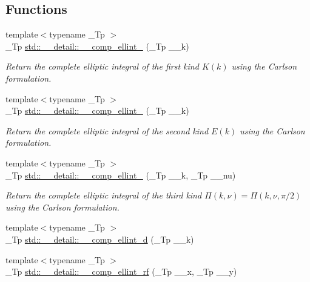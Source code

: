 \subsection*{Functions}
\begin{DoxyCompactItemize}
\item 
{\footnotesize template$<$typename \+\_\+\+Tp $>$ }\\\+\_\+\+Tp \hyperlink{namespacestd_1_1____detail_a7b23bcf7e9f20b1e353a047126e13af1}{std\+::\+\_\+\+\_\+detail\+::\+\_\+\+\_\+comp\+\_\+ellint\+\_} (\+\_\+\+Tp \+\_\+\+\_\+k)
\begin{DoxyCompactList}\small\item\em Return the complete elliptic integral of the first kind $ K(k) $ using the Carlson formulation. \end{DoxyCompactList}\item 
{\footnotesize template$<$typename \+\_\+\+Tp $>$ }\\\+\_\+\+Tp \hyperlink{namespacestd_1_1____detail_a4836f4db24abd037705100750f82d375}{std\+::\+\_\+\+\_\+detail\+::\+\_\+\+\_\+comp\+\_\+ellint\+\_} (\+\_\+\+Tp \+\_\+\+\_\+k)
\begin{DoxyCompactList}\small\item\em Return the complete elliptic integral of the second kind $ E(k) $ using the Carlson formulation. \end{DoxyCompactList}\item 
{\footnotesize template$<$typename \+\_\+\+Tp $>$ }\\\+\_\+\+Tp \hyperlink{namespacestd_1_1____detail_a26b35b5d72366d30ac4644db8f2f8be4}{std\+::\+\_\+\+\_\+detail\+::\+\_\+\+\_\+comp\+\_\+ellint\+\_} (\+\_\+\+Tp \+\_\+\+\_\+k, \+\_\+\+Tp \+\_\+\+\_\+nu)
\begin{DoxyCompactList}\small\item\em Return the complete elliptic integral of the third kind $ \Pi(k,\nu) = \Pi(k,\nu,\pi/2) $ using the Carlson formulation. \end{DoxyCompactList}\item 
{\footnotesize template$<$typename \+\_\+\+Tp $>$ }\\\+\_\+\+Tp \hyperlink{namespacestd_1_1____detail_add5220a1ab03915e4a45dc547bb8eef6}{std\+::\+\_\+\+\_\+detail\+::\+\_\+\+\_\+comp\+\_\+ellint\+\_\+d} (\+\_\+\+Tp \+\_\+\+\_\+k)
\item 
{\footnotesize template$<$typename \+\_\+\+Tp $>$ }\\\+\_\+\+Tp \hyperlink{namespacestd_1_1____detail_a41ecec8820344d3575b464ecd4db5171}{std\+::\+\_\+\+\_\+detail\+::\+\_\+\+\_\+comp\+\_\+ellint\+\_\+rf} (\+\_\+\+Tp \+\_\+\+\_\+x, \+\_\+\+Tp \+\_\+\+\_\+y)

\end{DoxyCompactItemize}
